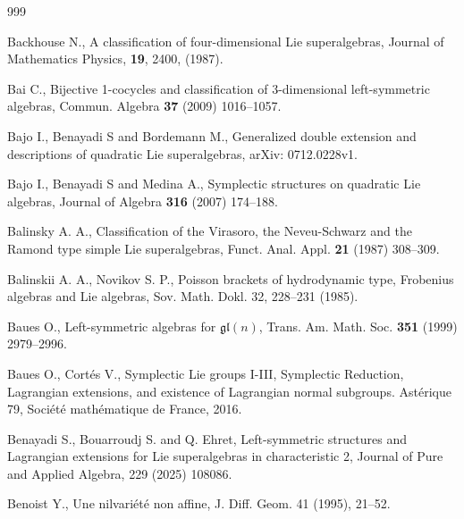\documentclass[12pt]{amsart}
\begin{document}
\begin{thebibliography}{999}


 Backhouse N., A classification of four-dimensional Lie superalgebras, Journal of Mathematics Physics, {\bf 19}, 2400, (1987).

 Bai C., Bijective 1-cocycles and classification of 3-dimensional left-symmetric algebras, Commun. Algebra {\bf 37} (2009) 1016--1057.

 Bajo I., Benayadi S and Bordemann M., Generalized double extension and descriptions of quadratic Lie superalgebras, arXiv: 0712.0228v1.

 Bajo I., Benayadi S and Medina A., Symplectic structures on quadratic Lie algebras, Journal of Algebra {\bf 316} (2007) 174--188.

 Balinsky A. A., Classification of the Virasoro, the Neveu-Schwarz and the Ramond 
type simple Lie superalgebras, Funct. Anal. Appl. {\bf 21} (1987) 308--309.

 Balinskii A. A., Novikov S. P., Poisson brackets of hydrodynamic type, Frobenius algebras and Lie algebras, Sov.
Math. Dokl. 32, 228--231 (1985).

 Baues O., Left-symmetric algebras for $\mathfrak{gl}(n)$, Trans. Am. Math. Soc. {\bf 351} (1999) 2979--2996.

 Baues O., Cort\'es V., Symplectic Lie groups I-III, Symplectic Reduction, Lagrangian extensions, and existence of Lagrangian normal subgroups. Ast\'erique 79, Soci\'et\'e math\'ematique de France, 2016.

 Benayadi S., Bouarroudj S. and Q. Ehret, Left-symmetric structures and Lagrangian extensions for Lie superalgebras in characteristic 2, Journal of Pure and Applied Algebra, 229 (2025) 108086.


  Benoist Y., Une nilvari\'et\'e non affine, J. Diff. Geom. 41 (1995), 21--52.






\end{thebibliography}
\end{document}
